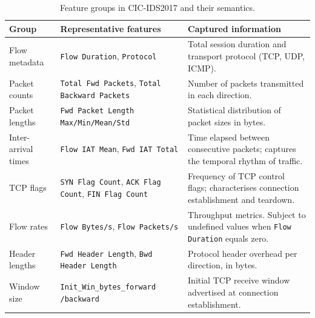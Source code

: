 \documentclass[12pt,a4paper]{article}
\begin{document}
\begin{table}[H]
    \centering
    \caption{Feature groups in CIC-IDS2017 and their semantics.}
    \label{tab:feature_groups}
    \begin{tabular}{|p{3cm}|p{4.5cm}|p{6.5cm}|}
        \hline
        \textbf{Group} & \textbf{Representative features}                                                         & \textbf{Captured information} \\
        \hline
        Flow metadata
                       & \texttt{Flow Duration}, \texttt{Protocol}
                       & Total session duration and transport protocol (TCP, UDP, ICMP).                                                          \\
        \hline
        Packet counts
                       & \texttt{Total Fwd Packets}, \texttt{Total Backward Packets}
                       & Number of packets transmitted in each direction.                                                                         \\
        \hline
        Packet lengths
                       & \texttt{Fwd Packet Length Max/Min/Mean/Std}
                       & Statistical distribution of packet sizes in bytes.                                                                       \\
        \hline
        Inter-arrival times
                       & \texttt{Flow IAT Mean}, \texttt{Fwd IAT Total}
                       & Time elapsed between consecutive packets; captures the temporal rhythm of traffic.                                       \\
        \hline
        TCP flags
                       & \texttt{SYN Flag Count}, \texttt{ACK Flag Count}, \texttt{FIN Flag Count}
                       & Frequency of TCP control flags; characterises connection establishment and teardown.                                     \\
        \hline
        Flow rates
                       & \texttt{Flow Bytes/s}, \texttt{Flow Packets/s}
                       & Throughput metrics. Subject to undefined values when \texttt{Flow Duration} equals zero.                                 \\
        \hline
        Header lengths
                       & \texttt{Fwd Header Length}, \texttt{Bwd Header Length}
                       & Protocol header overhead per direction, in bytes.                                                                        \\
        \hline
        Window size
                       & \texttt{Init\_Win\_bytes\_forward /backward}
                       & Initial TCP receive window advertised at connection establishment.                                                       \\
        \hline
    \end{tabular}
\end{table}  
\end{document}
